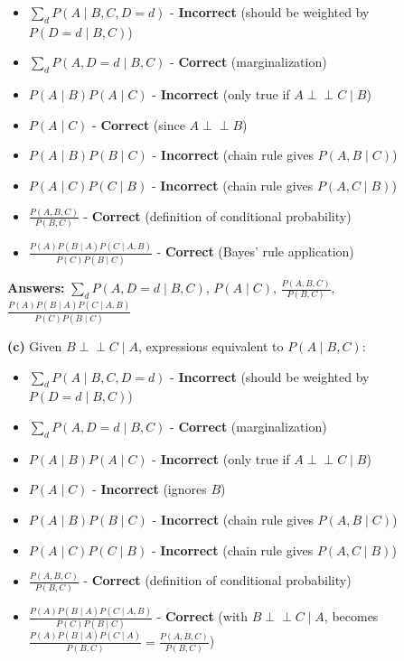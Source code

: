 \documentclass[11pt]{article}
\begin{document}
\begin{itemize}
\item $\sum_d P(A \mid B, C, D = d)$ - \textbf{Incorrect} (should be weighted by $P(D = d \mid B, C)$)
\item $\sum_d P(A, D = d \mid B, C)$ - \textbf{Correct} (marginalization)
\item $P(A \mid B) P(A \mid C)$ - \textbf{Incorrect} (only true if $A \perp\!\!\!\perp C \mid B$)
\item $P(A \mid C)$ - \textbf{Correct} (since $A \perp\!\!\!\perp B$)
\item $P(A \mid B) P(B \mid C)$ - \textbf{Incorrect} (chain rule gives $P(A, B \mid C)$)
\item $P(A \mid C) P(C \mid B)$ - \textbf{Incorrect} (chain rule gives $P(A, C \mid B)$)
\item $\frac{P(A, B, C)}{P(B, C)}$ - \textbf{Correct} (definition of conditional probability)
\item $\frac{P(A) P(B \mid A) P(C \mid A, B)}{P(C) P(B \mid C)}$ - \textbf{Correct} (Bayes' rule application)
\end{itemize}

\textbf{Answers:} $\boxed{\sum_d P(A, D = d \mid B, C)}$, $\boxed{P(A \mid C)}$, $\boxed{\frac{P(A, B, C)}{P(B, C)}}$, $\boxed{\frac{P(A) P(B \mid A) P(C \mid A, B)}{P(C) P(B \mid C)}}$

\textbf{(c)} Given $B \perp\!\!\!\perp C \mid A$, expressions equivalent to $P(A \mid B, C)$:

\begin{itemize}
\item $\sum_d P(A \mid B, C, D = d)$ - \textbf{Incorrect} (should be weighted by $P(D = d \mid B, C)$)
\item $\sum_d P(A, D = d \mid B, C)$ - \textbf{Correct} (marginalization)
\item $P(A \mid B) P(A \mid C)$ - \textbf{Incorrect} (only true if $A \perp\!\!\!\perp C \mid B$)
\item $P(A \mid C)$ - \textbf{Incorrect} (ignores $B$)
\item $P(A \mid B) P(B \mid C)$ - \textbf{Incorrect} (chain rule gives $P(A, B \mid C)$)
\item $P(A \mid C) P(C \mid B)$ - \textbf{Incorrect} (chain rule gives $P(A, C \mid B)$)
\item $\frac{P(A, B, C)}{P(B, C)}$ - \textbf{Correct} (definition of conditional probability)
\item $\frac{P(A) P(B \mid A) P(C \mid A, B)}{P(C) P(B \mid C)}$ - \textbf{Correct} (with $B \perp\!\!\!\perp C \mid A$, becomes $\frac{P(A) P(B \mid A) P(C \mid A)}{P(B, C)} = \frac{P(A, B, C)}{P(B, C)}$)
\end{itemize}
\end{document}
